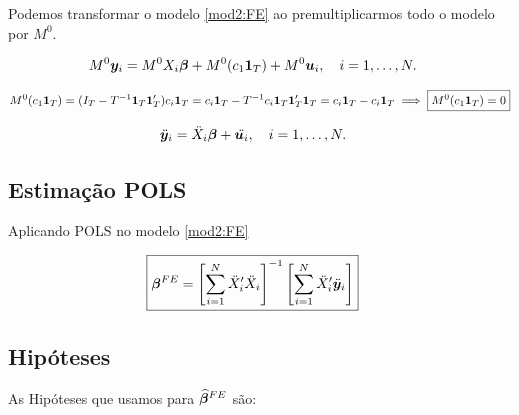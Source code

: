 \documentclass[11pt, oneside, a4paper, article]{article}
\numberwithin{equation}{section}
\begin{document}
Podemos transformar o modelo \eqref{mod2:FE} ao premultiplicarmos todo o modelo por $M^{0}$.

\vspace{-1 em}
\begin{align*} 
M^{0} \boldsymbol{y}_{i} &= M^{0} X_{i} \boldsymbol{\beta} + M^{0} ( c_{1} \boldsymbol{1}_{T} ) + M^{0} \boldsymbol{u}_{i},
\quad i = 1, \dots, N.
\end{align*}

\vspace{-1 em}
\begin{align*} 
M^{0} ( c_{1} \boldsymbol{1}_{T} ) = 
( I_{T} - T^{-1} \boldsymbol{1}_{T} \boldsymbol{1}_{T}' ) c_{i} \boldsymbol{1}_{T} 
=
c_{i} \boldsymbol{1}_{T} - T^{-1} c_{i} \boldsymbol{1}_{T} \boldsymbol{1}_{T}' \boldsymbol{1}_{T} 
=
c_{i} \boldsymbol{1}_{T} - c_{i} \boldsymbol{1}_{T} 
\implies
\boxed{ M^{0} ( c_{1} \boldsymbol{1}_{T} ) = 0 }
\end{align*}

\vspace{-1 em}
\begin{align} \label{mod2:FE}
\ddot{\boldsymbol{y}}_{i} &= \ddot{X}_{i} \boldsymbol{\beta} + \ddot{\boldsymbol{u}_{i}},
\quad i = 1, \dots, N.
\end{align}

\subsection*{Estimação POLS}

Aplicando POLS no modelo \eqref{mod2:FE}

\vspace{-1 em}
\begin{align} \label{beta:pols:FE}
\Aboxed{
\mbs{\beta}^{FE} =
\left[ \sum_{i=1}^{N} \ddot{X}_{i}' \ddot{X}_{i} \right]^{-1}
\left[ \sum_{i=1}^{N} \ddot{X}_{i}' \ddot{\mbs{y}}_{i} \right]
}
\end{align}

\subsection*{Hipóteses}

As Hipóteses que usamos para $\boldsymbol{\widehat{\beta}}^{FE}$ são:
\end{document}
